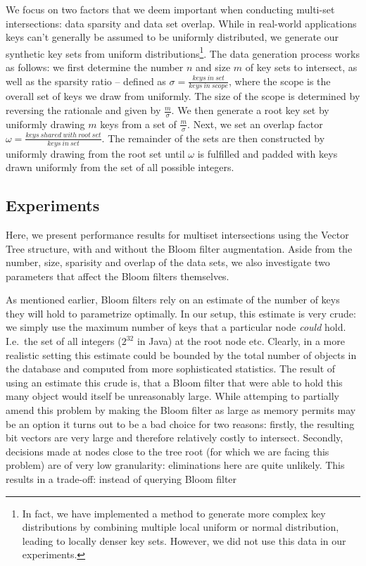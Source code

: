 \documentclass[11pt,letterpaper]{article}
\begin{document}
We focus on two factors that we deem important when conducting
multi-set intersections: data sparsity and data set overlap. While in
real-world applications keys can't generally be assumed to be
uniformly distributed, we generate our synthetic key sets from uniform
distributions\footnote{In fact, we have implemented a method to
  generate more complex key distributions by combining multiple local
  uniform or normal distribution, leading to locally denser key
  sets. However, we did not use this data in our experiments.}. The
data generation process works as follows: we first determine the
number $n$ and size $m$ of key sets to intersect, as well as the
sparsity ratio -- defined as $\sigma =
\frac{\mathit{keys~in~set}}{\mathit{keys~in~scope}}$, where the scope
is the overall set of keys we draw from uniformly. The size of the
scope is determined by reversing the rationale and given by
$\frac{m}{\sigma}$. We then generate a root key set by uniformly
drawing $m$ keys from a set of $\frac{m}{\sigma}$. Next, we set an
overlap factor $\omega =
\frac{\mathit{keys~shared~with~root~set}}{\mathit{keys~in~set}}$. The
remainder of the sets are then constructed by uniformly drawing from
the root set until $\omega$ is fulfilled and padded with keys drawn
uniformly from the set of all possible integers.

\subsection{Experiments}

Here, we present performance results for multiset intersections using
the Vector Tree structure, with and without the Bloom filter
augmentation. Aside from the number, size, sparisity and overlap of
the data sets, we also investigate two parameters that affect the
Bloom filters themselves. 

As mentioned earlier, Bloom filters rely on an estimate of the number
of keys they will hold to parametrize optimally. In our setup, this
estimate is very crude: we simply use the maximum number of keys that
a particular node \emph{could} hold. I.e.\ the set of all integers
($2^{32}$ in Java) at the root node etc. Clearly, in a more realistic
setting this estimate could be bounded by the total number of objects
in the database and computed from more sophisticated statistics. The
result of using an estimate this crude is, that a Bloom filter that
were able to hold this many object would itself be unreasonably
large. While attemping to partially amend this problem by making the
Bloom filter as large as memory permits may be an option it turns out
to be a bad choice for two reasons: firstly, the resulting bit vectors
are very large and therefore relatively costly to intersect. Secondly,
decisions made at nodes close to the tree root (for which we are
facing this problem) are of very low granularity: eliminations here
are quite unlikely. This results in a trade-off: instead of querying
Bloom filter
\end{document}
